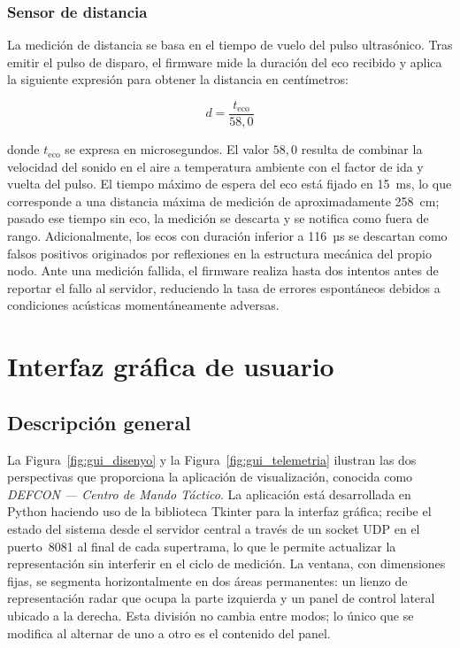 \subsubsection*{Sensor de distancia}

La medición de distancia se basa en el tiempo de vuelo del pulso ultrasónico. Tras emitir el pulso de disparo, el firmware mide la duración del eco recibido y aplica la siguiente expresión para obtener la distancia en centímetros:

\begin{equation}
d = \frac{t_{\text{eco}}}{58{,}0}
\label{eq:distancia_tof}
\end{equation}

donde $t_{\text{eco}}$ se expresa en microsegundos. El valor $58{,}0$ resulta de combinar la velocidad del sonido en el aire a temperatura ambiente con el factor de ida y vuelta del pulso. El tiempo máximo de espera del eco está fijado en 15~ms, lo que corresponde a una distancia máxima de medición de aproximadamente 258~cm; pasado ese tiempo sin eco, la medición se descarta y se notifica como fuera de rango. Adicionalmente, los ecos con duración inferior a 116~µs se descartan como falsos positivos originados por reflexiones en la estructura mecánica del propio nodo. Ante una medición fallida, el firmware realiza hasta dos intentos antes de reportar el fallo al servidor, reduciendo la tasa de errores espontáneos debidos a condiciones acústicas momentáneamente adversas.

\section{Interfaz gráfica de usuario}

\subsection{Descripción general}

La Figura~\ref{fig:gui_disenyo} y la Figura~\ref{fig:gui_telemetria} ilustran las dos perspectivas que proporciona la aplicación de visualización, conocida como \textit{DEFCON — Centro de Mando Táctico}. La aplicación está desarrollada en Python haciendo uso de la biblioteca Tkinter para la interfaz gráfica; recibe el estado del sistema desde el servidor central a través de un socket UDP en el puerto~8081 al final de cada supertrama, lo que le permite actualizar la representación sin interferir en el ciclo de medición. La ventana, con dimensiones fijas, se segmenta horizontalmente en dos áreas permanentes: un lienzo de representación radar que ocupa la parte izquierda y un panel de control lateral ubicado a la derecha. Esta división no cambia entre modos; lo único que se modifica al alternar de uno a otro es el contenido del panel.

